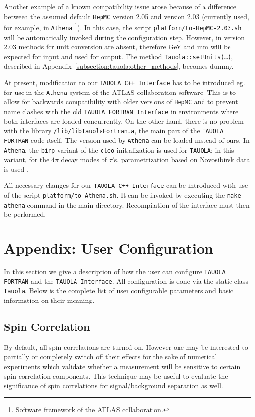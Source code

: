 \documentclass[]{Tauola_interface_design}
\begin{document}
Another example of a known  compatibility issue arose because of a difference between the assumed default 
   {\tt HepMC} version 2.05 and  version 2.03 (currently used, for example, in {\tt Athena}%
\footnote{Software framework   of the ATLAS collaboration.}). 
In this case, the script  {\tt platform/to-HepMC-2.03.sh} will be automatically invoked during the configuration
step.
However, in version 2.03 methods for unit conversion
are absent,  therefore GeV and mm will be expected for input and used for output. The method
  {\tt Tauola::setUnits(\dots)},
described in Appendix~\ref{subsection:tauola:other_methods}, becomes dummy.



At present, modification to our {\tt TAUOLA C++ Interface}  has to be introduced
eg.  for use
in the {\tt Athena} system
of the ATLAS collaboration software.  This is to allow for backwards compatibility with 
older versions of
{\tt HepMC}  and to prevent name clashes with the old {\tt TAUOLA FORTRAN
Interface} in environments where both interfaces are loaded concurrently.
 On the other 
hand, there is no problem with the library {\tt /lib/libTauolaFortran.a}, the 
main part of the {\tt TAUOLA FORTRAN} code itself. The version used by {\tt Athena} can be loaded 
instead of ours. In 
{\tt Athena}, the {\tt binp} variant of the {\tt cleo} initialization is used for
{\tt TAUOLA}; in this variant, 
 for the $4\pi$  decay modes of $\tau$'s, parametrization based 
on Novosibirsk data 
is used \cite{Bondar:2002mw}. 

All necessary changes for our {\tt TAUOLA C++ Interface} can be introduced 
with use of the script {\tt platform/to-Athena.sh}.
It can be invoked by 
executing the {\tt make athena} command in the main directory. 
Recompilation of the interface must then be performed.



\section{Appendix: User  Configuration}
\label{sec:User Configuration}
In this section we give a description of how the user can configure {\tt TAUOLA FORTRAN}
and the {\tt TAUOLA Interface}.
All configuration is done via the static class {\tt Tauola}. Below is the 
complete list of user configurable parameters and basic information on their
meaning.

\subsection{Spin Correlation}
By default, all spin correlations are turned on. However one may be interested
to  partially or completely switch off their effects for the sake of numerical 
experiments which validate whether a measurement will be sensitive to certain spin correlation 
components.
This technique may be useful to evaluate the significance of spin correlations for 
signal/background separation as well. 
\end{document}
